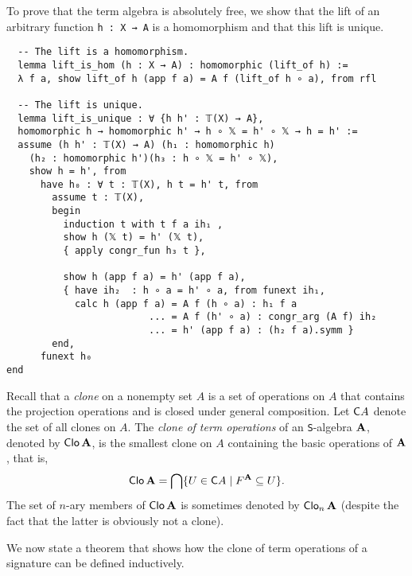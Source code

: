 \documentclass[11pt]{amsart}  %
\begin{document}
  To prove that the term algebra is absolutely free, we show that
  the lift of an arbitrary function \lstinline{h : X → A} is a homomorphism
  and that this lift is unique.
  \begin{lstlisting}
  -- The lift is a homomorphism.
  lemma lift_is_hom (h : X → A) : homomorphic (lift_of h) :=
  λ f a, show lift_of h (app f a) = A f (lift_of h ∘ a), from rfl

  -- The lift is unique.
  lemma lift_is_unique : ∀ {h h' : 𝕋(X) → A},
  homomorphic h → homomorphic h' → h ∘ 𝕏 = h' ∘ 𝕏 → h = h' :=
  assume (h h' : 𝕋(X) → A) (h₁ : homomorphic h)
    (h₂ : homomorphic h')(h₃ : h ∘ 𝕏 = h' ∘ 𝕏),
    show h = h', from 
      have h₀ : ∀ t : 𝕋(X), h t = h' t, from 
        assume t : 𝕋(X), 
        begin
          induction t with t f a ih₁ ,
          show h (𝕏 t) = h' (𝕏 t),
          { apply congr_fun h₃ t },

          show h (app f a) = h' (app f a),
          { have ih₂  : h ∘ a = h' ∘ a, from funext ih₁,
            calc h (app f a) = A f (h ∘ a) : h₁ f a
                         ... = A f (h' ∘ a) : congr_arg (A f) ih₂ 
                         ... = h' (app f a) : (h₂ f a).symm }
        end,
      funext h₀ 
end
\end{lstlisting}






\ifextver



Recall that a \emph{clone} on a nonempty set $A$ is a set of operations on $A$
that contains the projection operations and is closed under general composition. 
Let $\mathsf{C} A$ denote the set of all clones on $A$.
The \emph{clone of term operations}
of an \lstinline{S}-algebra $\mathbf{A}$, denoted by $\operatorname{\mathsf{Clo}} \mathbf{A}$,
is the smallest clone on $A$ containing the basic operations of $\mathbf{A}$, that is,
\[
\operatorname{\mathsf{Clo}} \mathbf{A} = \bigcap \{ U \in \mathsf{C} A \mid F^{\mathbf{A}} \subseteq U\}.
\]
The set of $n$-ary members of 
$\operatorname{\mathsf{Clo}} \mathbf{A}$ is sometimes denoted by $\operatorname{\mathsf{Clo}}_n \mathbf{A}$ %
(despite the fact that the latter is obviously not a clone).

We now state a theorem that shows how the clone of term operations of a signature can be defined inductively.
 
\end{document}
